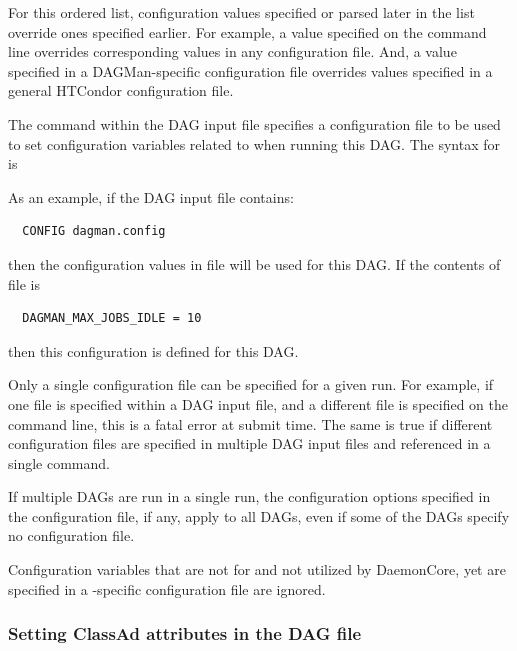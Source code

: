 For this ordered list, 
configuration values specified or parsed later in the list
override ones specified earlier.
For example, a value specified on the
 command line overrides corresponding values in any
configuration file.
And, a value specified in a DAGMan-specific configuration
file overrides values specified in a general HTCondor configuration file.

The  command within the DAG input file specifies a 
configuration file to be used to set configuration variables 
related to  when running this DAG.
The syntax for  is

 

As an example, if the DAG input file contains:
\begin{verbatim}
  CONFIG dagman.config
\end{verbatim}
then the configuration values in file  will be used
for this DAG.
If the contents of file  is 
\begin{verbatim}
  DAGMAN_MAX_JOBS_IDLE = 10
\end{verbatim}
then this configuration is defined for this DAG. 

Only a single configuration file can be specified for a given
 run.  For example, if one file is specified within a DAG
input file,
and a different file is specified on the  command
line, this is a fatal error at submit time.
The same is true if
different configuration files are specified in multiple DAG input files
and referenced in a single  command.

If multiple DAGs are run in a single  run, 
the configuration options specified in the  configuration
file, if any, apply to all DAGs, even if some of the DAGs specify no
configuration file.

Configuration variables that are not for 
and not utilized by DaemonCore, yet are specified in a
-specific configuration file are ignored.

\subsubsection{\label{sec:DAG-SetAttributes}Setting ClassAd attributes in the DAG file}

